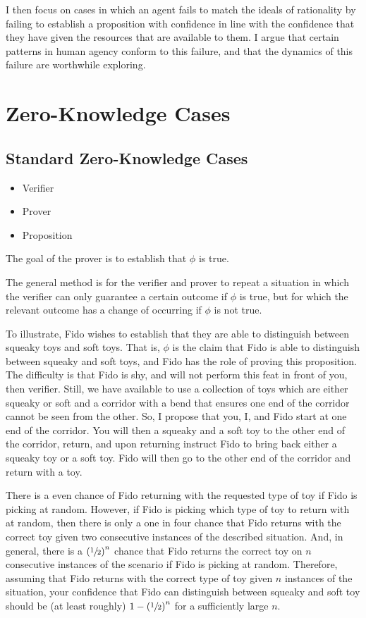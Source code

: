 \documentclass[10pt]{article}
\begin{document}
I then focus on cases in which an agent fails to match the ideals of rationality by failing to establish a proposition with confidence in line with the confidence that they have given the resources that are available to them.
I argue that certain patterns in human agency conform to this failure, and that the dynamics of this failure are worthwhile exploring.

\section{Zero-Knowledge Cases}
\label{sec:zero-knowledge-cases}

\subsection{Standard Zero-Knowledge Cases}
\label{sec:stand-zero-knowl}

\begin{itemize}
\item Verifier
\item Prover
\item Proposition
\end{itemize}

The goal of the prover is to establish that \(\phi\) is true.

The general method is for the verifier and prover to repeat a situation in which the verifier can only guarantee a certain outcome if \(\phi\) is true, but for which the relevant outcome has a change of occurring if \(\phi\) is not true.

To illustrate, Fido wishes to establish that they are able to distinguish between squeaky toys and soft toys.
That is, \(\phi\) is the claim that Fido is able to distinguish between squeaky and soft toys, and Fido has the role of proving this proposition.
The difficulty is that Fido is shy, and will not perform this feat in front of you, then verifier.
Still, we have available to use a collection of toys which are either squeaky or soft and a corridor with a bend that ensures one end of the corridor cannot be seen from the other.
So, I propose that you, I, and Fido start at one end of the corridor.
You will then a squeaky and a soft toy to the other end of the corridor, return, and upon returning instruct Fido to bring back either a squeaky toy or a soft toy.
Fido will then go to the other end of the corridor and return with a toy.

There is a even chance of Fido returning with the requested type of toy if Fido is picking at random.
However, if Fido is picking which type of toy to return with at random, then there is only a one in four chance that Fido returns with the correct toy given two consecutive instances of the described situation.
And, in general, there is a \(\left(\sfrac{1}{2}\right)^{n}\) chance that Fido returns the correct toy on \(n\) consecutive instances of the scenario if Fido is picking at random.
Therefore, assuming that Fido returns with the correct type of toy given \(n\) instances of the situation, your confidence that Fido can distinguish between squeaky and soft toy should be (at least roughly) \(1 - \left(\sfrac{1}{2}\right)^{n}\) for a sufficiently large \(n\).
\end{document}
